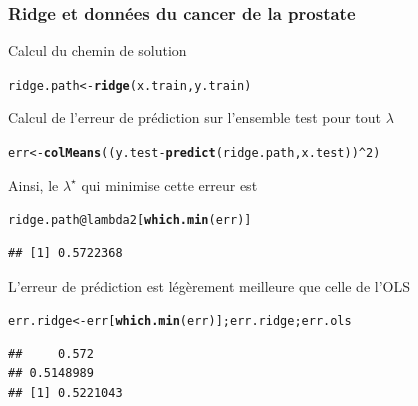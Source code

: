 \documentclass{beamer}\usepackage[]{graphicx}\usepackage[]{color}
\makeatletter
\newcommand{\hlnum}[1]{\textcolor[rgb]{0.686,0.059,0.569}{#1}}%
\newcommand{\hlopt}[1]{\textcolor[rgb]{0,0,0}{#1}}%
\newcommand{\hlstd}[1]{\textcolor[rgb]{0.345,0.345,0.345}{#1}}%
\newcommand{\hlkwb}[1]{\textcolor[rgb]{0.69,0.353,0.396}{#1}}%
\newcommand{\hlkwc}[1]{\textcolor[rgb]{0.333,0.667,0.333}{#1}}%
\newcommand{\hlkwd}[1]{\textcolor[rgb]{0.737,0.353,0.396}{\textbf{#1}}}%
\newenvironment{kframe}{%
 \def\at@end@of@kframe{}%
 \ifinner\ifhmode%
  \def\at@end@of@kframe{\end{minipage}}%
  \begin{minipage}{\columnwidth}%
 \fi\fi%
 \def\FrameCommand##1{\hskip\@totalleftmargin \hskip-\fboxsep
 \colorbox{shadecolor}{##1}\hskip-\fboxsep
     \hskip-\linewidth \hskip-\@totalleftmargin \hskip\columnwidth}%
 \MakeFramed {\advance\hsize-\width
   \@totalleftmargin\z@ \linewidth\hsize
   \@setminipage}}%
 {\par\unskip\endMakeFramed%
 \at@end@of@kframe}
\newenvironment{knitrout}{}{} %
\makeatother
\begin{document}
\begin{frame}[containsverbatim]
  \frametitle{Ridge et données du cancer de la prostate}

  \vfill

Calcul du chemin de solution
\begin{knitrout}\scriptsize
{}\color{fgcolor}\begin{kframe}
\begin{alltt}
\hlstd{ridge.path} \hlkwb{<-} \hlkwd{ridge}\hlstd{(x.train,y.train)}
\end{alltt}
\end{kframe}
\end{knitrout}

\vfill

Calcul de l'erreur de prédiction sur l'ensemble test pour tout $\lambda$
\begin{knitrout}\scriptsize
{}\color{fgcolor}\begin{kframe}
\begin{alltt}
\hlstd{err} \hlkwb{<-} \hlkwd{colMeans}\hlstd{((y.test}\hlopt{-}\hlkwd{predict}\hlstd{(ridge.path,x.test))}\hlopt{^}\hlnum{2}\hlstd{)}
\end{alltt}
\end{kframe}
\end{knitrout}

\vfill

Ainsi, le $\lambda^\star$ qui minimise cette erreur est 
\begin{knitrout}\scriptsize
{}\color{fgcolor}\begin{kframe}
\begin{alltt}
\hlstd{ridge.path}\hlopt{@}\hlkwc{lambda2}\hlstd{[}\hlkwd{which.min}\hlstd{(err)]}
\end{alltt}
\begin{verbatim}
## [1] 0.5722368
\end{verbatim}
\end{kframe}
\end{knitrout}

L'erreur de prédiction est légèrement meilleure que celle de l'OLS
\begin{knitrout}\scriptsize
{}\color{fgcolor}\begin{kframe}
\begin{alltt}
\hlstd{err.ridge} \hlkwb{<-} \hlstd{err[}\hlkwd{which.min}\hlstd{(err)]; err.ridge; err.ols}
\end{alltt}
\begin{verbatim}
##     0.572 
## 0.5148989
## [1] 0.5221043
\end{verbatim}
\end{kframe}
\end{knitrout}

\end{frame}
\end{document}
